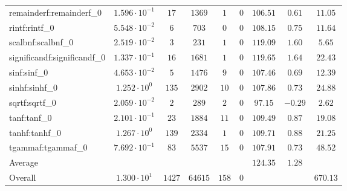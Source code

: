 \begin{tabular}{|l|c|c|c|c|c|c|c|c|}
remainderf:remainderf\_0     & $ 1.596 \cdot 10^{-1} $ & $ 17     $ & $ 1369  $ & $ 1   $ & $ 0   $ & $ 106.51      $ & $ 0.61    $ & $ 11.05   $ \\
rintf:rintf\_0               & $ 5.548 \cdot 10^{-2} $ & $ 6      $ & $ 703   $ & $ 0   $ & $ 0   $ & $ 108.15      $ & $ 0.75    $ & $ 11.64   $ \\
scalbnf:scalbnf\_0           & $ 2.519 \cdot 10^{-2} $ & $ 3      $ & $ 231   $ & $ 1   $ & $ 0   $ & $ 119.09      $ & $ 1.60    $ & $ 5.65    $ \\
significandf:significandf\_0 & $ 1.337 \cdot 10^{-1} $ & $ 16     $ & $ 1681  $ & $ 1   $ & $ 0   $ & $ 119.65      $ & $ 1.64    $ & $ 22.43   $ \\
sinf:sinf\_0                 & $ 4.653 \cdot 10^{-2} $ & $ 5      $ & $ 1476  $ & $ 9   $ & $ 0   $ & $ 107.46      $ & $ 0.69    $ & $ 12.39   $ \\
sinhf:sinhf\_0               & $ 1.252 \cdot 10^{0}  $ & $ 135    $ & $ 2902  $ & $ 10  $ & $ 0   $ & $ 107.86      $ & $ 0.73    $ & $ 24.88   $ \\
sqrtf:sqrtf\_0               & $ 2.059 \cdot 10^{-2} $ & $ 2      $ & $ 289   $ & $ 2   $ & $ 0   $ & $ 97.15       $ & $ -0.29   $ & $ 2.62    $ \\
tanf:tanf\_0                 & $ 2.101 \cdot 10^{-1} $ & $ 23     $ & $ 1884  $ & $ 11  $ & $ 0   $ & $ 109.49      $ & $ 0.87    $ & $ 19.08   $ \\
tanhf:tanhf\_0               & $ 1.267 \cdot 10^{0}  $ & $ 139    $ & $ 2334  $ & $ 1   $ & $ 0   $ & $ 109.71      $ & $ 0.88    $ & $ 21.25   $ \\
tgammaf:tgammaf\_0           & $ 7.692 \cdot 10^{-1} $ & $ 83     $ & $ 5537  $ & $ 15  $ & $ 0   $ & $ 107.91      $ & $ 0.73    $ & $ 48.52   $ \\
\hline
Average                      & $                     $ & $        $ & $       $ & $     $ & $     $ & $ 124.35      $ & $ 1.28    $ & $         $ \\
\hline
Overall                      & $ 1.300 \cdot 10^{1}  $ & $ 1427   $ & $ 64615 $ & $ 158 $ & $ 0   $ & $             $ & $         $ & $ 670.13  $ \\
\hline
\end{tabular}
